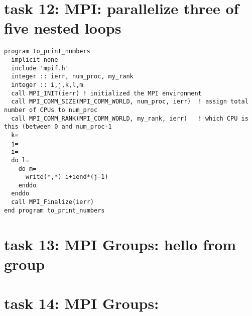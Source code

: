 \documentclass[12pt]{report}
\begin{document}
\section{task 12: MPI: parallelize three of five nested loops}
\begin{verbatim}
program to_print_numbers
  implicit none
  include 'mpif.h'
  integer :: ierr, num_proc, my_rank  
  integer :: i,j,k,l,m
  call MPI_INIT(ierr) ! initialized the MPI environment
  call MPI_COMM_SIZE(MPI_COMM_WORLD, num_proc, ierr)  ! assign total number of CPUs to num_proc
  call MPI_COMM_RANK(MPI_COMM_WORLD, my_rank, ierr)   ! which CPU is this (between 0 and num_proc-1
  k=
  j=
  i=
  do l=
    do m=
      write(*,*) i+iend*(j-1)
    enddo
  enddo
  call MPI_Finalize(ierr)
end program to_print_numbers   
\end{verbatim}

\section{task 13: MPI Groups: hello from group}
\section{task 14: MPI Groups: }
\end{document}
